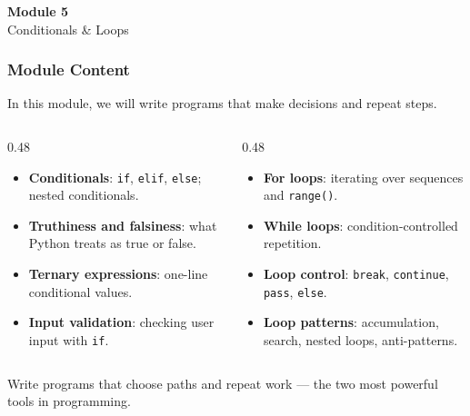 \documentclass[aspectratio=169,10pt]{beamer}
\newcommand{\keyword}[1]{\textcolor{PrimaryBlue}{\textbf{#1}}}
\begin{document}

\begin{noheadline}
\begin{frame}
\vspace{1.35cm}
\begin{center}
  {\fontsize{30}{36}\selectfont\textbf{Module 5}}\\[0.35cm]
  {\fontsize{25}{30}\selectfont Conditionals \& Loops}\\[0.7cm]
\end{center}
\end{frame}
\end{noheadline}


\begin{frame}[fragile]
\frametitle{Module Content}
\small
In this module, we will write programs that make decisions and repeat steps.

\vspace{0.18cm}
\begin{columns}[T,totalwidth=0.96\textwidth]
\begin{column}{0.48\textwidth}
\begin{itemize}\setlength\itemsep{0.05cm}
  \item \keyword{Conditionals}: \texttt{if}, \texttt{elif}, \texttt{else}; nested conditionals.
  \item \keyword{Truthiness and falsiness}: what Python treats as true or false.
  \item \keyword{Ternary expressions}: one-line conditional values.
  \item \keyword{Input validation}: checking user input with \texttt{if}.
\end{itemize}
\end{column}
\begin{column}{0.48\textwidth}
\begin{itemize}\setlength\itemsep{0.05cm}
  \item \keyword{For loops}: iterating over sequences and \texttt{range()}.
  \item \keyword{While loops}: condition-controlled repetition.
  \item \keyword{Loop control}: \texttt{break}, \texttt{continue}, \texttt{pass}, \texttt{else}.
  \item \keyword{Loop patterns}: accumulation, search, nested loops, anti-patterns.
\end{itemize}
\end{column}
\end{columns}
\vspace{0.10cm}
\begin{tcolorbox}[lecturebox,title=Learning goal]
Write programs that choose paths and repeat work --- the two most powerful tools in programming.
\end{tcolorbox}
\end{frame}
\end{document}
